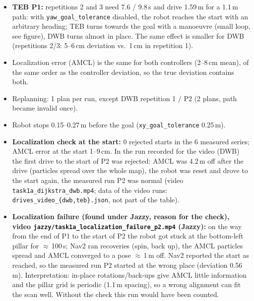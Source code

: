 \documentclass[10pt]{article}
\newcommand{\pkg}[1]{\texttt{#1}}
\begin{document}
\begin{itemize}
        into the gaps between the pillars, i.e.\ TEB keeps proposing the other route; in the video run the robot stays on
        the global path. Decision 2026-11-23: keep the default (\pkg{enable\_homotopy\_class\_planning: true})
        and report it as a property of TEB: it may leave the global path, DWB cannot.
  \item \textbf{TEB P1:} repetitions 2 and 3 need 7.6 / 9.8\,s and drive 1.59\,m for a 1.1\,m path: with
        \pkg{yaw\_goal\_tolerance} disabled, the robot reaches the start with an arbitrary heading; TEB turns towards
        the goal with a manoeuvre (small loop, see figure), DWB turns almost in place. The same effect is smaller
        for DWB (repetitions 2/3: 5--6\,cm deviation vs.\ 1\,cm in repetition 1).
  \item Localization error (AMCL) is the same for both controllers (2--8\,cm mean), of the same order as the
        controller deviation, so the true deviation contains both.
  \item Replanning: 1 plan per run, except DWB repetition 1 / P2 (2 plans, path became invalid once).
  \item Robot stops 0.15--0.27\,m before the goal (\pkg{xy\_goal\_tolerance} 0.25\,m).
  \item \textbf{Localization check at the start:} 0 rejected starts in the 6 measured series; AMCL error at the start
        1--9\,cm. In the run recorded for the video (DWB) the first drive to the start of P2 was rejected: AMCL was
        4.2\,m off after the drive (particles spread over the whole map), the robot was reset and drove to the start
        again, the measured run P2 was normal (video \pkg{task1a\_dijkstra\_dwb.mp4}; data of the video runs:
        \pkg{drives\_video\_\{dwb,teb\}.json}, not part of the table).
  \item \textbf{Localization failure (found under Jazzy, reason for the check), video
        \pkg{jazzy/task1a\_localization\_failure\_p2.mp4} (Jazzy):} on the way from the end of P1 to the start of P2 the robot
        got stuck at the bottom-left pillar for $\approx$\,100\,s; Nav2 ran recoveries (spin, back up), the AMCL
        particles spread and AMCL converged to a pose $\approx$\,1\,m off. Nav2 reported the start as reached, so the
        measured run P2 started at the wrong place (deviation 0.56\,m). Interpretation: in-place rotations/back-ups
        give AMCL little information and the pillar grid is periodic (1.1\,m spacing), so a wrong alignment can fit the
        scan well. Without the check this run would have been counted.
\end{itemize}
\end{document}
